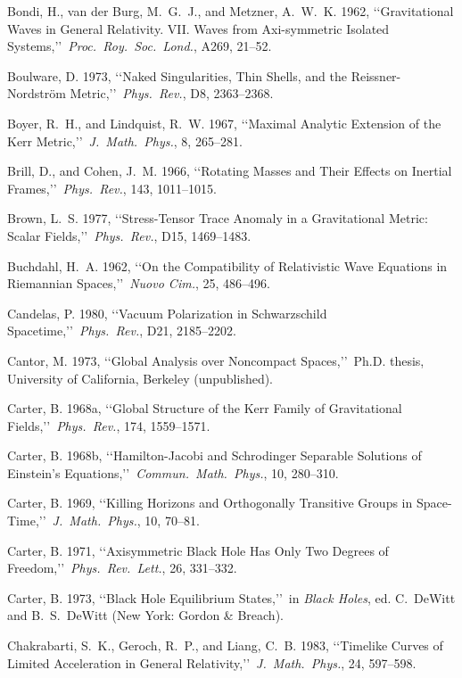 \item Bondi, H., van der Burg, M.~G.~J., and Metzner, A.~W.~K. 1962, \lq\lq Gravitational Waves in General Relativity. VII. Waves from Axi-symmetric Isolated Systems,\rq\rq\ \emph{Proc.\ Roy.\ Soc.\ Lond.}, A269, 21--52.
\item Boulware, D. 1973, \lq\lq Naked Singularities, Thin Shells, and the Reissner-Nordstr{\"o}m Metric,\rq\rq\ \emph{Phys.\ Rev.}, D8, 2363--2368.
\item Boyer, R.~H., and Lindquist, R.~W. 1967, \lq\lq Maximal Analytic Extension of the Kerr Metric,\rq\rq\ \emph{J.\ Math.\ Phys.}, 8, 265--281.
\item Brill, D., and Cohen, J.~M. 1966, \lq\lq Rotating Masses and Their Effects on Inertial Frames,\rq\rq\ \emph{Phys.\ Rev.}, 143, 1011--1015.
\item Brown, L.~S. 1977, \lq\lq Stress-Tensor Trace Anomaly in a Gravitational Metric: Scalar Fields,\rq\rq\ \emph{Phys.\ Rev.}, D15, 1469--1483.
\item Buchdahl, H.~A. 1962, \lq\lq On the Compatibility of Relativistic Wave Equations in Riemannian Spaces,\rq\rq\ \emph{Nuovo Cim.}, 25, 486--496.
\item Candelas, P. 1980, \lq\lq Vacuum Polarization in Schwarzschild Spacetime,\rq\rq\ \emph{Phys.\ Rev.}, D21, 2185--2202.
\item Cantor, M. 1973, \lq\lq Global Analysis over Noncompact Spaces,\rq\rq\ Ph.D. thesis, University of California, Berkeley (unpublished).
\item Carter, B. 1968a, \lq\lq Global Structure of the Kerr Family of Gravitational Fields,\rq\rq\ \emph{Phys.\ Rev.}, 174, 1559--1571.
\item Carter, B. 1968b, \lq\lq Hamilton-Jacobi and Schrodinger Separable Solutions of Einstein's Equations,\rq\rq\ \emph{Commun.\ Math.\ Phys.}, 10, 280--310.
\item Carter, B. 1969, \lq\lq Killing Horizons and Orthogonally Transitive Groups in Space-Time,\rq\rq\ \emph{J.\ Math.\ Phys.}, 10, 70--81.
\item Carter, B. 1971, \lq\lq Axisymmetric Black Hole Has Only Two Degrees of Freedom,\rq\rq\ \emph{Phys.\ Rev.\ Lett.}, 26, 331--332.
\item Carter, B. 1973, \lq\lq Black Hole Equilibrium States,\rq\rq\ in \emph{Black Holes}, ed. C.~DeWitt and B.~S.~DeWitt (New York: Gordon \& Breach).
\item Chakrabarti, S.~K., Geroch, R.~P., and Liang, C.~B. 1983, \lq\lq Timelike Curves of Limited Acceleration in General Relativity,\rq\rq\ \emph{J.\ Math.\ Phys.}, 24, 597--598.

